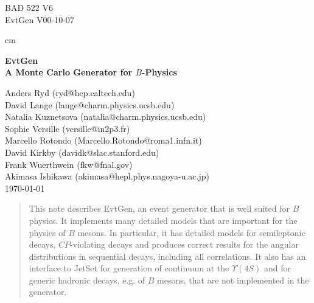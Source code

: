 
%
%
\addtolength{\topmargin}{-0.75in}
\addtolength{\textwidth}{1.1in}
\addtolength{\textheight}{1.25in}
\addtolength{\hoffset}{-0.6in}


\makeindex



\begin{flushright}
BAD 522 V6\\
EvtGen V00-10-07
\end{flushright}

 cm


\begin{center}
\bf \Large {\bf EvtGen\\ 
A Monte Carlo Generator for $B$-Physics}
\end{center}

\begin{center}
Anders Ryd (ryd@hep.caltech.edu)\\
David Lange (lange@charm.physics.ucsb.edu)\\
Natalia Kuznetsova (natalia@charm.physics.ucsb.edu)\\
Sophie Versille (versille@in2p3.fr)\\
Marcello Rotondo (Marcello.Rotondo@roma1.infn.it)\\
David Kirkby (davidk@slac.stanford.edu)\\
Frank Wuerthwein (fkw@fnal.gov)\\
Akimasa Ishikawa (akimasa@hepl.phys.nagoya-u.ac.jp)\\
{\today} \\
\end{center}

\begin{abstract}
\smallskip
This note describes EvtGen, an event generator that 
is well suited for $B$ physics. It implements many
detailed models that are important for the
physics of $B$ mesons. In particular, it has detailed
models for semileptonic decays, $CP$-violating decays and
produces correct results for the angular distributions
in sequential decays, including all correlations.
It also has an interface to JetSet for generation of 
continuum at the $\Upsilon(4S)$ and for generic hadronic
decays, e.g. of $B$ mesons, that are not implemented in the
generator.   
\end{abstract}

\newpage

\tableofcontents

